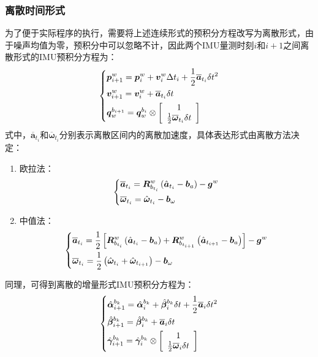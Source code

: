 \subsubsection{离散时间形式}
为了便于实际程序的执行，需要将上述连续形式的预积分方程改写为离散形式，由于噪声均值为零，预积分中可以忽略不计，因此两个IMU量测时刻$i$和$i+1$之间离散形式的IMU预积分方程为：
\begin{equation}
\centering
\left\{
\begin{aligned}
&\bm{p}_{i+1}^w=\bm{p}_i^w+\bm{v}_i^w\Delta t_i+\frac{1}{2}\overline{\bm{a}}_{t_i}\delta t^2\\
&\bm{v}_{i+1}^w=\bm{v}_i^w+\overline{\bm{a}}_{t_i}\delta t\\
&\bm{q}_w^{b_{i+1}}=\bm{q}_w^{b_{i}}\otimes\left[\begin{array}{c}1\\\frac{1}{2}\overline{\bm{\omega}}_{t_i}\delta t
\end{array}\right]
\end{aligned}
\right.
\end{equation}
式中，$\overline{\bm{a}}_{t_i}$和$\overline{\bm{\omega}}_{t_i}$分别表示离散区间内的离散加速度，具体表达形式由离散方法决定：
\begin{enumerate}
	\item 欧拉法：
	\begin{equation}
	\centering
	\left\{
	\begin{aligned}
	&\overline{\bm{a}}_{t_i}=\bm{R}_{b_{t_i}}^w\left(\hat{\bm{a}}_{t_i}-\bm{b}_a\right)-\bm{g}^w\\
	&\overline{\bm{\omega}}_{t_i}=\hat{\bm{\omega}}_{t_i}-\bm{b}_\omega
	\end{aligned}
	\right.
	\end{equation}
	\item 中值法：
	\begin{equation}
	\centering
	\left\{
	\begin{aligned}
	&\overline{\bm{a}}_{t_i}=\frac{1}{2}\left[\bm{R}_{b_{t_i}}^w\left(\hat{\bm{a}}_{t_i}-\bm{b}_a\right)+\bm{R}_{b_{t_{i+1}}}^w\left(\hat{\bm{a}}_{t_{i+1}}-\bm{b}_a\right)\right]-\bm{g}^w\\
	&\overline{\bm{\omega}}_{t_i}=\frac{1}{2}\left(\hat{\bm{\omega}}_{t_i}+\hat{\bm{\omega}}_{t_{i+1}}\right)-\bm{b}_\omega
	\end{aligned}
	\right.
	\end{equation}
\end{enumerate}
同理，可得到离散的增量形式IMU预积分方程为：
\begin{equation}
\centering
\left\{
\begin{aligned}
&\hat{\bm{\alpha}}_{i+1}^{b_k}=\hat{\bm{\alpha}}_i^{b_k}+\hat{\bm{\beta}}_i^{b_k}\delta t+\frac{1}{2}\overline{\bm{a}}_i\delta t^2\\
&\hat{\bm{\beta}}_{i+1}^{b_k}=\hat{\bm{\beta}}_i^{b_k}+\overline{\bm{a}}_i\delta t\\
&\hat{\bm{\gamma}}_{i+1}^{b_k}=\hat{\bm{\gamma}}_i^{b_k}\otimes\left[\begin{array}{c}1\\\frac{1}{2}\overline{\bm{\omega}}_i\delta t\end{array}\right]
\end{aligned}
\right.
\end{equation}
